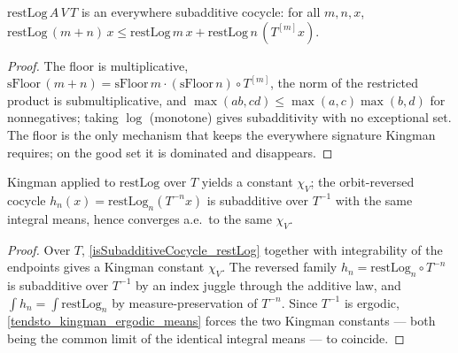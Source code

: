 \begin{lemma}\label{isSubadditiveCocycle_restLog}
  \leanok
  \(\mathrm{restLog}\,A\,V\,T\) is an everywhere subadditive cocycle: for all \(m,n,x\), \(\mathrm{restLog}\,(m+n)\,x \le \mathrm{restLog}\,m\,x + \mathrm{restLog}\,n\,(T^{[m]}x)\).
\end{lemma}
\begin{proof}\leanok
  The floor is multiplicative, \(\mathrm{sFloor}\,(m+n) = \mathrm{sFloor}\,m \cdot (\mathrm{sFloor}\,n)\circ T^{[m]}\), the norm of the restricted product is submultiplicative, and \(\max(ab, cd) \le \max(a,c)\max(b,d)\) for nonnegatives; taking \(\log\) (monotone) gives subadditivity with no exceptional set. The floor is the only mechanism that keeps the everywhere signature Kingman requires; on the good set it is dominated and disappears.
\end{proof}

\begin{lemma}\label{restLog_backward_kingman}
  \leanok
  Kingman applied to \(\mathrm{restLog}\) over \(T\) yields a constant \(\chi_V\); the orbit-reversed cocycle \(h_n(x) = \mathrm{restLog}_n(T^{-n}x)\) is subadditive over \(T^{-1}\) with the same integral means, hence converges a.e.\ to the same \(\chi_V\).
\end{lemma}
\begin{proof}\leanok
  Over \(T\), \cref{isSubadditiveCocycle_restLog} together with integrability of the endpoints gives a Kingman constant \(\chi_V\). The reversed family \(h_n = \mathrm{restLog}_n\circ T^{-n}\) is subadditive over \(T^{-1}\) by an index juggle through the additive law, and \(\int h_n = \int \mathrm{restLog}_n\) by measure-preservation of \(T^{-n}\). Since \(T^{-1}\) is ergodic, \cref{tendsto_kingman_ergodic_means} forces the two Kingman constants — both being the common limit of the identical integral means — to coincide.
\end{proof}

